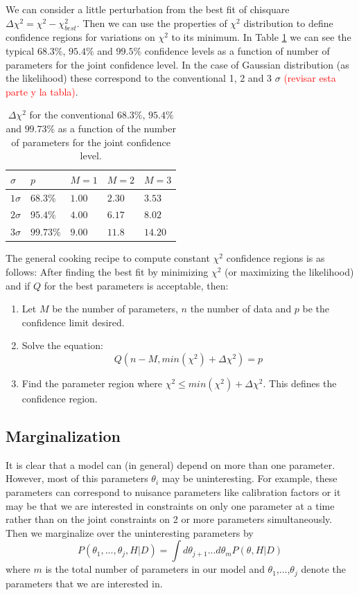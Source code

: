 \documentclass[onecolumn,           %
               showpacs,            %
               preprintnumbers,     %
               aps,                 %
               prl,          	    %
               letterpaper,             %
               superscriptaddress,      %
               nofootinbib,         %
               tightenlines,        %
               floats,floatfix      %
               ,usenatbib,
               ]{revtex4-1}
\begin{document}
We can consider a little perturbation from the best fit of chisquare $\Delta\chi^2=\chi^2-\chi^2_{best}$. Then we can use the properties of $\chi^2$ distribution to define confidence regions for variations on $\chi^2$ to its minimum. In Table \ref{tableerrors} we can see the typical $68.3 \%$, $95.4\%$ and $99.5\%$ confidence levels as a function of number of parameters for the joint confidence level. In the case of Gaussian distribution (as the likelihood) these correspond to the conventional 1, 2 and 3 $\sigma$ \textcolor{red}{(revisar esta parte y la tabla)}.
\begin{table}[h!]
\centering
\begin{tabular}{||l|l|l|l|l||} 
 \hline
$\sigma$ & $p$ & $M=1$ & $M=2$ & $M=3$\\
\hline
$1\sigma$ & $68.3 \%$ & $1.00$ & $2.30$ & $3.53$\\
$2\sigma$ & $95.4 \%$ & $4.00$ & $6.17$ & $8.02$\\
$3\sigma$ & $99.73\%$ & $9.00$ & $11.8$ & $14.20$\\
\hline
\end{tabular}
\caption{\footnotesize{$\Delta \chi^2$ for the conventional $68.3\%$, $95.4\%$ and $99.73\%$ as a function of the number of parameters for the joint confidence level.}}\label{tableerrors}
\end{table}

The general cooking recipe to compute constant $\chi^2$ confidence regions is as follows: After finding the best fit by minimizing $\chi^2$ (or maximizing the likelihood) and if $Q$ for the best parameters is acceptable, then:
\begin{enumerate}
\item Let $M$ be the number of parameters, $n$ the number of data and $p$ be the confidence limit desired.
\item Solve the equation:
\begin{equation}
Q(n-M,min(\chi^2)+\Delta\chi^2)=p
\end{equation}
\item Find the parameter region where $\chi^2\leq min(\chi^2)+\Delta\chi^2$. This defines the confidence region.
\end{enumerate}
\subsection{Marginalization}

It is clear that a model can (in general) depend on more than one parameter. However, most of this parameters $\theta_i$ may be uninteresting. For example, these parameters can correspond to nuisance parameters like calibration factors or it may be that we are interested in constraints on only one parameter at a time rather than on the joint constraints on 2 or more parameters simultaneously. Then we marginalize over the uninteresting parameters by
\begin{equation}
P(\theta_1,...,\theta_j,H|D)=\int d\theta_{j+1}...d\theta_{m}P(\theta,H|D)
\end{equation}
where $m$ is the total number of parameters in our model and $\theta_1$,...,$\theta_j$ denote the parameters that we are interested in.
\end{document}
